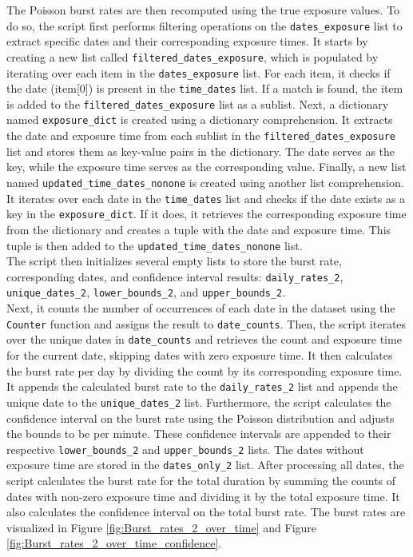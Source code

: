 \documentclass[twocolumn]{aastex631}
\begin{document}
\indent The Poisson burst rates are then recomputed using the true exposure values. To do so, the script first performs filtering operations on the \texttt{dates{\_}exposure} list to extract specific dates and their corresponding exposure times. It starts by creating a new list called \texttt{filtered{\_}dates{\_}exposure}, which is populated by iterating over each item in the \texttt{dates{\_}exposure} list. For each item, it checks if the date (item[0]) is present in the \texttt{time{\_}dates} list. If a match is found, the item is added to the \texttt{filtered{\_}dates{\_}exposure} list as a sublist. Next, a dictionary named \texttt{exposure{\_}dict} is created using a dictionary comprehension. It extracts the date and exposure time from each sublist in the \texttt{filtered{\_}dates{\_}exposure} list and stores them as key-value pairs in the dictionary. The date serves as the key, while the exposure time serves as the corresponding value. Finally, a new list named \texttt{updated{\_}time{\_}dates{\_}nonone} is created using another list comprehension. It iterates over each date in the \texttt{time{\_}dates} list and checks if the date exists as a key in the \texttt{exposure{\_}dict}. If it does, it retrieves the corresponding exposure time from the dictionary and creates a tuple with the date and exposure time. This tuple is then added to the \texttt{updated{\_}time{\_}dates{\_}nonone} list.\\
The script then initializes several empty lists to store the burst rate, corresponding dates, and confidence interval results: \texttt{daily{\_}rates{\_}2}, \texttt{unique{\_}dates{\_}2}, \texttt{lower{\_}bounds{\_}2}, and \texttt{upper{\_}bounds{\_}2}.\\
\indent Next, it counts the number of occurrences of each date in the dataset using the \texttt{Counter} function and assigns the result to \texttt{date{\_}counts}. Then, the script iterates over the unique dates in \texttt{date{\_}counts} and retrieves the count and exposure time for the current date, skipping dates with zero exposure time. It then calculates the burst rate per day by dividing the count by its corresponding exposure time. It appends the calculated burst rate to the \texttt{daily{\_}rates{\_}2} list and appends the unique date to the \texttt{unique{\_}dates{\_}2} list. Furthermore, the script calculates the confidence interval on the burst rate using the Poisson distribution and adjusts the bounds to be per minute. These confidence intervals are appended to their respective \texttt{lower{\_}bounds{\_}2} and \texttt{upper{\_}bounds{\_}2} lists. The dates without exposure time are stored in the \texttt{dates{\_}only{\_}2} list. After processing all dates, the script calculates the burst rate for the total duration by summing the counts of dates with non-zero exposure time and dividing it by the total exposure time. It also calculates the confidence interval on the total burst rate. The burst rates are visualized in Figure \ref{fig:Burst_rates_2_over_time} and Figure \ref{fig:Burst_rates_2_over_time_confidence}. 
\end{document}
